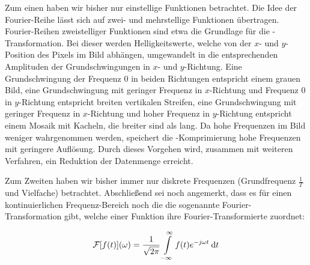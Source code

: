 Zum einen haben wir bisher nur einstellige Funktionen betrachtet. Die Idee der Fourier-Reihe lässt sich auf zwei- und mehrstellige Funktionen übertragen. Fourier-Reihen zweistelliger Funktionen sind etwa die Grundlage für die -Transformation. Bei dieser werden Helligkeitswerte, welche von der $x$- und $y$-Position des Pixels im Bild abhängen, umgewandelt in die entsprechenden Amplituden der Grundschwingungen in $x$- und $y$-Richtung. Eine Grundschwingung der Frequenz $0$ in beiden Richtungen entspricht einem grauen Bild, eine Grundschwingung mit geringer Frequenz in $x$-Richtung und Frequenz 0 in $y$-Richtung entspricht breiten vertikalen Streifen, eine Grundschwingung mit geringer Frequenz in $x$-Richtung und hoher Frequenz in $y$-Richtung entspricht einem Mosaik mit Kacheln, die breiter sind als lang. Da hohe Frequenzen im Bild weniger wahrgenommen werden, speichert die -Komprimierung hohe Frequenzen mit geringere Auflösung. Durch dieses Vorgehen wird, zusammen mit weiteren Verfahren, ein Reduktion der Datenmenge erreicht.

Zum Zweiten haben wir bisher immer nur diskrete Frequenzen (Grundfrequenz $\frac{1}{T}$ und Vielfache) betrachtet. Abschließend sei noch angemerkt, dass es für einen kontinuierlichen Frequenz-Bereich noch die die sogenannte Fourier-Transformation gibt, welche einer Funktion ihre Fourier-Transformierte zuordnet:

$$
    \mathcal{F}[f(t)](\omega) = \frac{1}{\sqrt{2\pi}} \int\limits_{-\infty}^\infty f(t) e^{-j \omega t} \:\mathrm{d}{t}
$$
